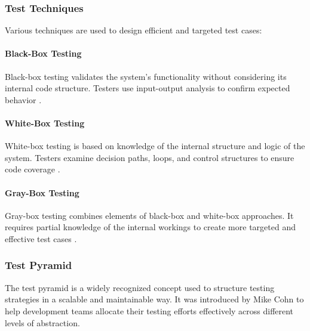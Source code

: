 \subsubsection{Test Techniques}

Various techniques are used to design efficient and targeted test cases:

\paragraph{Black-Box Testing}

Black-box testing validates the system's functionality without considering its internal code structure. Testers use input-output analysis to confirm expected behavior \cite{myers2011art}.

\paragraph{White-Box Testing}

White-box testing is based on knowledge of the internal structure and logic of the system. Testers examine decision paths, loops, and control structures to ensure code coverage \cite{burnstein2003practical}.

\paragraph{Gray-Box Testing}

Gray-box testing combines elements of black-box and white-box approaches. It requires partial knowledge of the internal workings to create more targeted and effective test cases \cite{ammann2016introduction}.

\subsubsection{Test Pyramid}

The test pyramid is a widely recognized concept used to structure testing strategies in a scalable and maintainable way. It was introduced by Mike Cohn \cite{cohn2009succeeding} to help development teams allocate their testing efforts effectively across different levels of abstraction.

